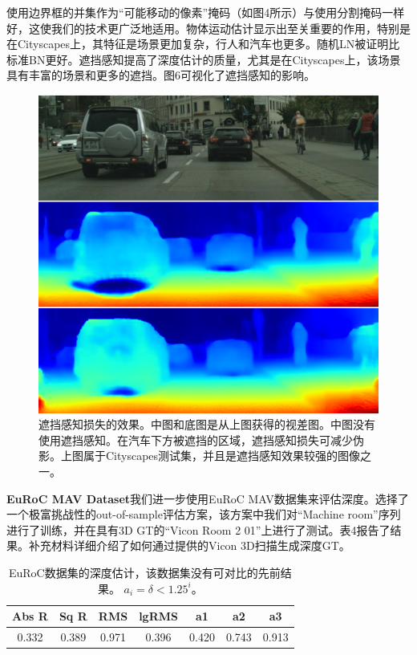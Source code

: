 \documentclass[10pt,journal,compsoc,UTF8]{IEEEtran}
\begin{document}
使用边界框的并集作为“可能移动的像素”掩码（如图4所示）与使用分割掩码一样好，这使我们的技术更广泛地适用。物体运动估计显示出至关重要的作用，特别是在Cityscapes上，其特征是场景更加复杂，行人和汽车也更多。随机LN被证明比标准BN更好。遮挡感知提高了深度估计的质量，尤其是在Cityscapes上，该场景具有丰富的场景和更多的遮挡。图6可视化了遮挡感知的影响。
\begin{figure}[htbp]
\begin{framed}
     \centering
       \includegraphics[width=1\linewidth]{imgs/6.png} 
     \caption{遮挡感知损失的效果。中图和底图是从上图获得的视差图。中图没有使用遮挡感知。在汽车下方被遮挡的区域，遮挡感知损失可减少伪影。上图属于Cityscapes测试集，并且是遮挡感知效果较强的图像之一。}
    \end{framed}
\end{figure}

\textbf{EuRoC MAV Dataset}我们进一步使用EuRoC MAV数据集来评估深度。选择了一个极富挑战性的out-of-sample评估方案，该方案中我们对“Machine room”序列进行了训练，并在具有3D GT的“Vicon Room 2 01”上进行了测试。表4报告了结果。补充材料详细介绍了如何通过提供的Vicon 3D扫描生成深度GT。
\begin{table}
  \centering
  \begin{tabular}{|c|c|c|c|c|c|c|}
  \hline
  Abs R& Sq R& RMS &lgRMS& a1& a2& a3\\
  \hline
  0.332& 0.389& 0.971& 0.396& 0.420& 0.743& 0.913\\
  \hline
  \end{tabular}
  \caption{EuRoC数据集的深度估计，该数据集没有可对比的先前结果。 $a_i = \delta <1.25^i$。}
\end{table}
\end{document}
